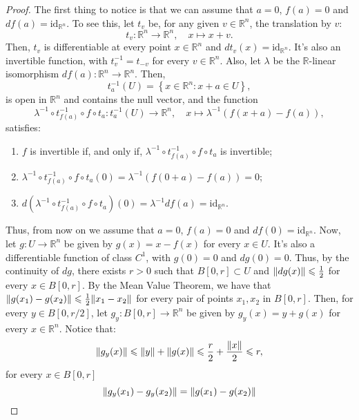 \begin{proof}
  The first thing to notice is that we can assume that \({a=0}\), \(f(a)=0\) and \(df(a)=\text{id}_{\mathbb{R}^{n}}\). To see this, let \(t_{v}\) be, for any given \({v}\in{\mathbb{R}^{n}}\), the translation by \(v\):
  \[
    t_{v}:\mathbb{R}^{n}\to\mathbb{R}^{n},\quad{{x}\mapsto{x+v}}.
  \]
  Then, \(t_{v}\) is differentiable at every point \({x}\in{\mathbb{R}^{n}}\) and \(dt_{v}(x)=\text{id}_{\mathbb{R}^{n}}\). It's also an invertible function, with \(t_{v}^{-1}=t_{-v}\) for every \({v}\in{\mathbb{R}^{n}}\). Also, let \(\lambda\) be the \(\mathbb{R}\)-linear isomorphism \(df(a):\mathbb{R}^{n}\to\mathbb{R}^{n}\). Then,
  \[
    t_{a}^{-1}(U)=\left\{{x}\in{\mathbb{R}^{n}}:{x+a}\in{U}\right\},
  \]
  is open in \(\mathbb{R}^{n}\) and contains the null vector, and the function
  \[
    \lambda^{-1}\circ{t_{f(a)}^{-1}}\circ{f}\circ{t_{a}}:t_{a}^{-1}(U)\to\mathbb{R}^{n},\quad{{x}\mapsto{\lambda^{-1}(f(x+a)-f(a))}},
  \]
  satisfies:
  \begin{enumerate}
    \item
      \(f\) is invertible if, and only if, \(\lambda^{-1}\circ{t_{f(a)}^{-1}}\circ{f}\circ{t_{a}}\) is invertible;
    \item
      \(\lambda^{-1}\circ{t_{f(a)}^{-1}}\circ{f}\circ{t_{a}}(0)=\lambda^{-1}\left(f(0+a)-f(a)\right)=0\);
    \item
      \(d\left(\lambda^{-1}\circ{t_{f(a)}^{-1}}\circ{f}\circ{t_{a}}\right)(0)=\lambda^{-1}df(a)=\text{id}_{\mathbb{R}^{n}}\).
  \end{enumerate}
  Thus, from now on we assume that \(a=0\), \(f(a)=0\) and \(df(0)=\text{id}_{\mathbb{R}^{n}}\). Now, let \(g:{U}\to{\mathbb{R}^{n}}\) be given by \(g(x)=x-f(x)\) for every \({x}\in{U}\). It's also a differentiable function of class \(C^{1}\), with \(g(0)=0\) and \(dg(0)=0\). Thus, by the continuity of \(dg\), there exists \(r>0\) such that \({B[0,r]}\subset{U}\) and \(\lVert dg(x)\rVert\leqslant{\frac{1}{2}}\) for every \({x}\in{B[0,r]}\). By the Mean Value Theorem, we have that \(\lVert g(x_{1})-g(x_{2})\rVert\leqslant{\frac{1}{2}\lVert x_{1}-x_{2}\rVert}\) for every pair of points \(x_{1},x_{2}\) in \(B[0,r]\). Then, for every \({y}\in{B[0,r/2]}\), let \(g_{y}:B[0,r]\to\mathbb{R}^{n}\) be given by \(g_{y}(x)=y+g(x)\) for every \({x}\in{\mathbb{R}^{n}}\). Notice that:
  \[
    \lVert g_{y}(x)\rVert
    \leqslant
    \lVert y\rVert+\lVert g(x)\rVert
    \leqslant
    \frac{r}{2}+\frac{\lVert x\rVert}{2}
    \leqslant
    r,
  \]
  for every \({x}\in{B[0,r]}\)
  \[
    \lVert g_{y}(x_{1})-g_{y}(x_{2})\rVert
    =
    \lVert g(x_{1})-g(x_{2})\rVert
\]
\end{proof}
